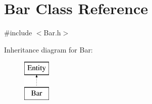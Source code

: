 \hypertarget{class_bar}{}\section{Bar Class Reference}
\label{class_bar}


{\ttfamily \#include $<$Bar.\+h$>$}

Inheritance diagram for Bar\+:\begin{figure}[H]
\begin{center}
\leavevmode
\includegraphics[height=2.000000cm]{class_bar}
\end{center}
\end{figure}
